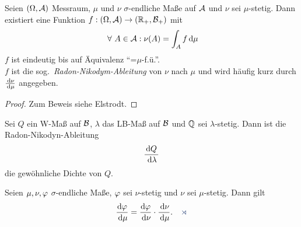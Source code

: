 \begin{propn}
Seien $(\Omega,\AA)$ Messraum, $\mu$ und $\nu$ $\sigma$-endliche Maße auf
$\AA$ und $\nu$ sei $\mu$-stetig.  Dann existiert eine Funktion
$f:(\Omega,\AA) \to (\R_+, \BB_+)$ mit
\begin{align*}
\forall A \in \AA : \nu(A)=\int_A f\dmu
\end{align*}
$f$ ist eindeutig bis auf Äquivalenz ``=$\mu$-f.ü.''. \\ $f$ ist die
sog.\ \emph{Radon-Nikodym-Ableitung} von $\nu$ nach $\mu$ und wird häufig
kurz durch $\frac{\dnu}{\dmu}$ angegeben.\fishhere
\end{propn}
\begin{proof}
Zum Beweis siehe Elstrodt.\qedhere
\end{proof}

\begin{bsp}
Sei $Q$ ein W-Maß auf $\BB$, $\lambda$ das LB-Maß auf $\BB$ und $\Q$ sei
$\lambda$-stetig. Dann ist die Radon-Nikodyn-Ableitung
\begin{align*}
\frac{\dQ}{\dlambda}
\end{align*}
die gewöhnliche Dichte von $Q$.\bsphere
\end{bsp}

\begin{propn}[Zusatz]
Seien $\mu,\nu,\ph$ $\sigma$-endliche Maße, $\ph$ sei $\nu$-stetig und $\nu$
sei $\mu$-stetig. Dann gilt
\begin{align*}
\frac{\dph}{\dmu} = \frac{\dph}{\dnu}\cdot \frac{\dnu}{\dmu}.\fishhere
\end{align*}
\end{propn}


